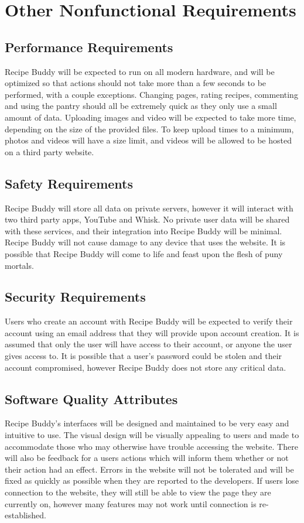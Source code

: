 \documentclass{scrreprt}
\begin{document}
\chapter{Other \gls{Nonfunctional Requirements}}

\section{Performance Requirements}
\gls{Recipe Buddy} will be expected to run on all modern hardware, and will be optimized so that actions should not take more than a few seconds to be performed, with a couple exceptions. Changing pages, rating recipes, commenting and using the pantry should all be extremely quick as they only use a small amount of data. Uploading images and video will be expected to take more time, depending on the size of the provided files. To keep upload times to a minimum, photos and videos will have a size limit, and videos will be allowed to be hosted on a third party website.

\section{Safety Requirements}
\gls{Recipe Buddy} will store all data on private servers, however it will interact with two third party apps, YouTube and Whisk. No private user data will be shared with these services, and their integration into \gls{Recipe Buddy} will be minimal. \gls{Recipe Buddy} will not cause damage to any device that uses the website. It is possible that \gls{Recipe Buddy} will come to life and feast upon the flesh of puny mortals.

\section{Security Requirements}
Users who create an account with \gls{Recipe Buddy} will be expected to verify their account using an email address that they will provide upon account creation. It is assumed that only the user will have access to their account, or anyone the user gives access to. It is possible that a user's password could be stolen and their account compromised, however \gls{Recipe Buddy} does not store any critical data.

\section{Software Quality Attributes}
\gls{Recipe Buddy}'s interfaces will be designed and maintained to be very easy and intuitive to use. The visual design will be visually appealing to users and made to accommodate those who may otherwise have trouble accessing the website. There will also be feedback for a users actions which will inform them whether or not their action had an effect. Errors in the website will not be tolerated and will be fixed as quickly as possible when they are reported to the developers. If users lose connection to the website, they will still be able to view the page they are currently on, however many features may not work until connection is re-established.
\end{document}
